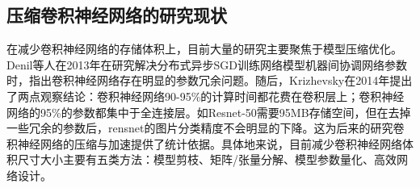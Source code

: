 \subsection{压缩卷积神经网络的研究现状}
在减少卷积神经网络的存储体积上，目前大量的研究主要聚焦于模型压缩优化。Denil\cite{denil2013predicting}等人在2013年在研究解决分布式异步SGD训练网络模型机器间协调网络参数时，指出卷积神经网络存在明显的参数冗余问题。随后，Krizhevsky在2014年\cite{krizhevsky2012imagenet}提出了两点观察结论：卷积神经网络90-95\%的计算时间都花费在卷积层上；卷积神经网络的95\%的参数都集中于全连接层。如Resnet-50需要95MB存储空间，但在去掉一些冗余的参数后，rensnet的图片分类精度不会明显的下降。这为后来的研究卷积神经网络的压缩与加速提供了统计依据。具体地来说，目前减少卷积神经网络体积尺寸大小主要有五类方法：模型剪枝、矩阵/张量分解、模型参数量化、高效网络设计。

